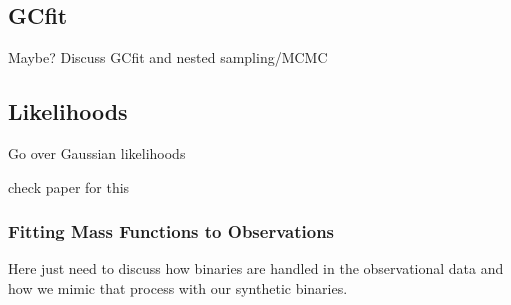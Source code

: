 \subsection{GCfit}

Maybe? Discuss GCfit and nested sampling/MCMC


\subsection{Likelihoods}

Go over Gaussian likelihoods

check paper for this

\subsubsection{Fitting Mass Functions to Observations}


Here just need to discuss how binaries are handled in the observational data and how we mimic that
process with our synthetic binaries.